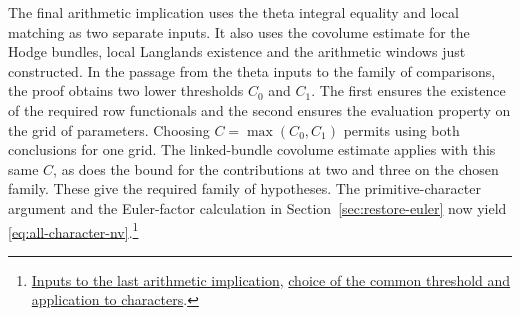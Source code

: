 The final arithmetic implication uses the theta integral equality and
local matching as two separate inputs. It also uses the covolume
estimate for the Hodge bundles, local Langlands existence and the
arithmetic windows just constructed. In the passage from the theta
inputs to the family of comparisons, the proof obtains two lower
thresholds \(C_0\) and \(C_1\). The first ensures the existence of
the required row functionals and the second ensures the evaluation
property on the grid of parameters. Choosing \(C=\max(C_0,C_1)\)
permits using both conclusions for one grid. The linked-bundle
covolume estimate applies with this same \(C\), as does the bound
for the contributions at two and three on the chosen family. These
give the required family of hypotheses. The primitive-character
argument and the Euler-factor calculation in
Section~\ref{sec:restore-euler} now yield
\eqref{eq:all-character-nv}.\footnote{\href{https://github.com/Deicyde/riemann-hypothesis/blob/40e56bab/src/Development/AutomorphicArithmetic/ThetaCorrespondence/ThetaPairLifts/ThirdPlaceSeries/EveryCharacterOfLiteratureOfVWin.lean\#L810-L813}{Inputs to the last arithmetic implication},
\href{https://github.com/Deicyde/riemann-hypothesis/blob/40e56bab/src/Development/AutomorphicArithmetic/ThetaCorrespondence/ThetaPairLifts/ThirdPlaceSeries/SiegelEisensteinSecondTermHypotheses.lean\#L44-L73}{choice of the common threshold and application to characters}.}
